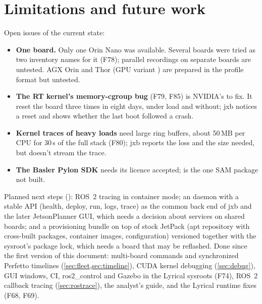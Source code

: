 \documentclass[11pt,a4paper]{article}
\newcommand{\jxb}{\textsf{jxb}}
\newcommand{\finding}[1]{\textsf{\small F#1}}
\begin{document}
\section{Limitations and future work}\label{sec:limits}
Open issues of the current state:
\begin{itemize}
  \item \textbf{One board.} Only one Orin Nano was available. Several boards were tried as two inventory names for it
        (\finding{78}); parallel recordings on separate boards are untested. AGX Orin and Thor (GPU variant
        ) are prepared in the profile format but untested.
  \item \textbf{The RT kernel's memory-cgroup bug} (\finding{79}, \finding{85}) is NVIDIA's to fix. It reset the board
        three times in eight days, under load and without; \jxb{} notices a reset and  shows
        whether the last boot followed a crash.
  \item \textbf{Kernel traces of heavy loads} need large ring buffers, about 50\,MB per CPU for 30\,s of the full stack
        (\finding{80}); \jxb{} reports the loss and the size needed, but doesn't stream the trace.
  \item \textbf{The Basler Pylon SDK} needs its licence accepted;  is the one SAM package not
        built.
\end{itemize}
Planned next steps (): ROS~2 tracing in container mode; an  daemon with a stable API (health, deploy,
run, logs, trace) as the common back end of \jxb{} and the later JetsonPlanner GUI, which needs a decision about
services on shared boards; and a provisioning bundle on top of stock JetPack (apt repository with cross-built packages,
container images, configuration) versioned together with the sysroot's package lock, which needs a board that may be
reflashed. Done since the first version of this document: multi-board commands and synchronized Perfetto timelines
(\cref{sec:fleet,sec:timeline}), CUDA kernel debugging (\cref{sec:debug}), GUI windows, CI, ros2\_control and Gazebo in
the Lyrical sysroots (\finding{74}), ROS~2 callback tracing (\cref{sec:rostrace}), the analyst's guide, and the Lyrical runtime fixes (\finding{68}, \finding{69}).

\end{document}
